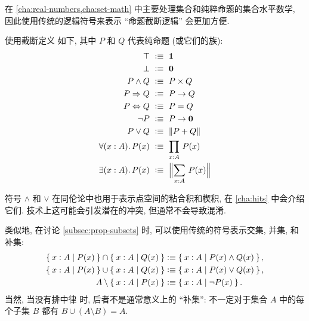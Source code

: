 在 \cref{cha:real-numbers,cha:set-math} 中主要处理集合和纯粹命题的集合水平数学, 因此使用传统的逻辑符号来表示 ``命题截断逻辑'' 会更加方便.

\begin{defn}
    \label{defn:logical-notation}
    使用截断定义 
    如下, 其中 $P$ 和 $Q$ 代表纯命题 (或它们的族):
        {\allowdisplaybreaks
    \begin{align*}
        \top            &\ \defeq \ \unit \\
        \bot            &\ \defeq \ \emptyt \\
        P \land Q       &\ \defeq \ P \times Q \\
        P \Rightarrow Q &\ \defeq \ P \to Q \\
        P \Leftrightarrow Q &\ \defeq \ P = Q \\
        \neg P          &\ \defeq \ P \to \emptyt \\
        P \lor Q        &\ \defeq \ \brck{P + Q} \\
        \fall{x : A} P(x) &\ \defeq \ \prd{x : A} P(x) \\
        \exis{x : A} P(x) &\ \defeq \ \Brck{\sm{x : A} P(x)}
    \end{align*}}
\end{defn}

符号 $\land$ 和 $\lor$ 在同伦论中也用于表示点空间的粘合积和楔积, 在 \cref{cha:hits} 中会介绍它们.
技术上这可能会引发潜在的冲突, 但通常不会导致混淆.

类似地, 在讨论 \cref{subsec:prop-subsets} 时, 可以使用传统的符号表示交集, 并集, 和补集:
%
%
%
%
%
%
\begin{align*}
    \Set{x:A | P(x)} \cap \Set{x:A | Q(x)}
    &\vcentcolon\equiv \Set{x:A | P(x) \land Q(x)},\\
    \Set{x:A | P(x)} \cup \Set{x:A | Q(x)}
    &\vcentcolon\equiv \Set{x:A | P(x) \lor Q(x)},\\
    A \setminus \Set{x:A | P(x)}
    &\vcentcolon\equiv \Set{x:A | \neg P(x)}.
\end{align*}
当然, 当没有排中律 \LEM{} 时, 后者不是通常意义上的 ``补集'': 不一定对于集合 $A$ 中的每个子集 $B$ 都有 $B \cup (A\setminus B) = A$.

%
%
%

